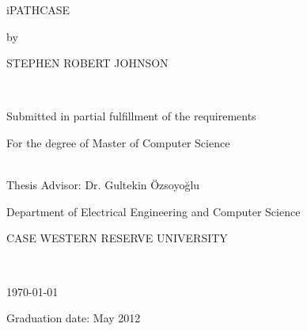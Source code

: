 \begin{titlepage}
    \begin{doublespace}
        \begin{center}
            \vspace*{0.5in}

            { \Large iPATHCASE }\\[0.5in]

            { \large by
            
            STEPHEN ROBERT JOHNSON }\\[0.5in]

            { \large Submitted in partial fulfillment of the requirements
            
            For the degree of Master of Computer Science}\\[0.5in]

            { \large Thesis Advisor: Dr. Gultekin \"{O}zsoyo\u{g}lu}\\[0.5in]

            { \large Department of Electrical Engineering and Computer Science
            
            CASE WESTERN RESERVE UNIVERSITY}\\[0.5in]

            \vfill

            { \large \today
            
            Graduation date: May 2012}\\[0.5in]
        \end{center}
    \end{doublespace}
\end{titlepage}
